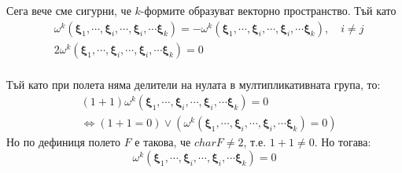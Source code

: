\documentclass[12pt]{article}
\newcommand\myxi[0]{\boldsymbol{\xi}}
\begin{document}
\begin{large}
Сега вече сме сигурни, че $k$-формите образуват векторно пространство. Тъй като
\begin{align*}
&\omega^k(\myxi_1,\cdots,\myxi_i,\cdots,\myxi_i,\cdots\myxi_k)=-\omega^k(\myxi_1,\cdots,\myxi_i,\cdots,\myxi_i,\cdots\myxi_k), \quad i \neq j \\
&2\omega^k(\myxi_1,\cdots,\myxi_i,\cdots,\myxi_i,\cdots\myxi_k)=0 \\
\end{align*}

\begin{comment}
тo в зависимост от $F$ има два случая:
\begin{enumerate}
\item $F$ е крайно, то  $\omega^k(\myxi_1,\cdots,\myxi_i,\cdots,\myxi_i,\cdots\myxi_k) \in \left\{a\in F \lvert a+a=0 \right\}$
\item $F$ е безкрайно, то  $\omega^k(\myxi_1,\cdots,\myxi_i,\cdots,\myxi_i,\cdots\myxi_k) \in \left\{a\in F \lvert a+a=0 \right\}$
\end{enumerate}
\end{comment}
Тъй като  при полета няма делители на нулата в мултипликативната група, то:
\begin{align*}
&(1+1)\omega^k(\myxi_1,\cdots,\myxi_i,\cdots,\myxi_i,\cdots\myxi_k)=0 \\
&\Longleftrightarrow (1+1=0) \lor (\omega^k(\myxi_1,\cdots,\myxi_i,\cdots,\myxi_i,\cdots\myxi_k)=0)
\end{align*}
Но по дефиниця полето $F$ е такова, че $char F \neq 2$, т.е. $1+1 \neq 0$. Но тогава:
\[\omega^k(\myxi_1,\cdots,\myxi_i,\cdots,\myxi_i,\cdots\myxi_k)=0
\]


\end{large}
\end{document}
